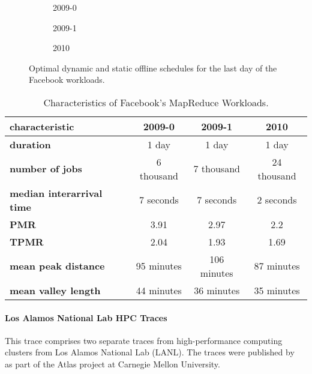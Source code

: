 \begin{figure}
    \begin{subfigure}[b]{.33\linewidth}
    \resizebox{\textwidth}{!}{}
    \caption{2009-0}
    \end{subfigure}
    \begin{subfigure}[b]{.3175\linewidth}
    \resizebox{\textwidth}{!}{}
    \caption{2009-1}
    \end{subfigure}
    \begin{subfigure}[b]{.3375\linewidth}
    \resizebox{\textwidth}{!}{}
    \caption{2010}
    \end{subfigure}
    \caption{Optimal dynamic and static offline schedules for the last day of the Facebook workloads.}
    \label{fig:facebook:schedule}
\end{figure}

\begin{table}
    \centering
    \begin{tabular}{>{\bfseries\centering}l|c|c|c}
        characteristic & 2009-0 & 2009-1 & 2010 \\\hline
        duration & 1 day & 1 day & 1 day \\
        number of jobs & 6 thousand & 7 thousand & 24 thousand \\
        median interarrival time & 7 seconds & 7 seconds & 2 seconds \\
        PMR & 3.91 & 2.97 & 2.2 \\
        TPMR & 2.04 & 1.93 & 1.69 \\
        mean peak distance & 95 minutes & 106 minutes & 87 minutes \\
        mean valley length & 44 minutes & 36 minutes & 35 minutes \\
    \end{tabular}
    \caption{Characteristics of Facebook's MapReduce Workloads.}
    \label{tab:facebook}
\end{table}

\paragraph{Los Alamos National Lab HPC Traces~\cite{Amvrosiadis2018_3, Amvrosiadis2018, Amvrosiadis2018_2}} This trace comprises two separate traces from high-performance computing clusters from Los Alamos National Lab (LANL). The traces were published by \citeauthor*{Amvrosiadis2018}~\cite{Amvrosiadis2018} as part of the Atlas project at Carnegie Mellon University.

